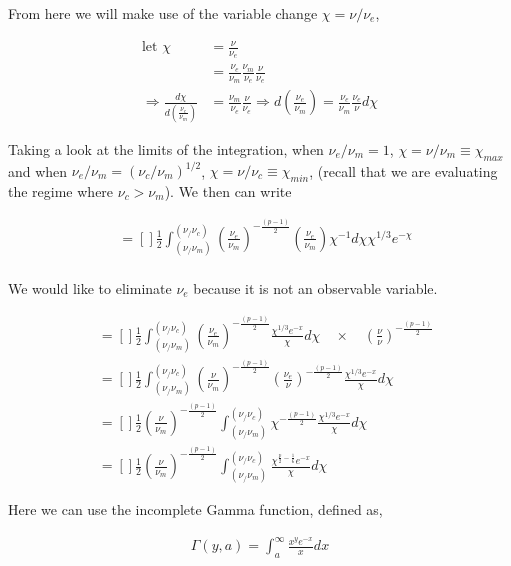 \documentclass[linenumbers,twocolumn]{aastex631}
\begin{document}
\begin{appendix}
From here we will make use of the variable change $\chi = \nu/\nu_e$,

\begin{align}
	\text{let } \chi &= \frac{\nu}{\nu_e}\\
	&= \frac{\nu_e}{\nu_m}\frac{\nu_m}{\nu_e}\frac{\nu}{\nu_e}\\
	\Rightarrow \frac{d\chi}{d\left(\frac{\nu_e}{\nu_m}\right)} &= \frac{\nu_m}{\nu_e} \frac{\nu}{\nu_e} \Rightarrow  d\left(\frac{\nu_e}{\nu_m}\right) = \frac{\nu_e}{\nu_m} \frac{\nu_e}{\nu} d\chi
\end{align}

Taking a look at the limits of the integration, when $\nu_e/\nu_m = 1$, $\chi = \nu/\nu_m \equiv \chi_{max}$ and when $\nu_e/\nu_m = (\nu_c/\nu_m)^{1/2}$, $\chi = \nu/\nu_c \equiv \chi_{min}$, (recall that we are evaluating the regime where $\nu_c > \nu_m$). We then can write

\begin{align}
	&= \left[\right]\frac{1}{2} \int_{(\nu_/\nu_m)}^{(\nu_/\nu_c)} \left(\frac{\nu_e}{\nu_m}\right)^{-\frac{(p-1)}{2}} \left(\frac{\nu_e}{\nu_m}\right) \chi^{-1} d\chi \chi^{1/3} e^{-\chi} \\
\end{align}

We would like to eliminate $\nu_e$ because it is not an observable variable. 

\begin{align}
	&= [ ]\frac{1}{2} \int_{(\nu_/\nu_m)}^{(\nu_/\nu_c)} \left(\frac{\nu_e}{\nu_m}\right)^{-\frac{(p-1)}{2}} \frac{\chi^{1/3}e^{-x}}{\chi} d\chi \quad \times \quad \left(\frac{\nu}{\nu}\right)^{-\frac{(p-1)}{2}} \\
	&= [ ]\frac{1}{2} \int_{(\nu_/\nu_m)}^{(\nu_/\nu_c)} \left(\frac{\nu}{\nu_m}\right)^{-\frac{(p-1)}{2}} \left(\frac{\nu_e}{\nu}\right)^{-\frac{(p-1)}{2}} \frac{\chi^{1/3}e^{-x}}{\chi} d\chi\\
	&= [ ]\frac{1}{2} \left(\frac{\nu}{\nu_m}\right)^{-\frac{(p-1)}{2}} \int_{(\nu_/\nu_m)}^{(\nu_/\nu_c)} \chi^{-\frac{(p-1)}{2}} \frac{\chi^{1/3}e^{-x}}{\chi} d\chi \\
	&= [ ]\frac{1}{2} \left(\frac{\nu}{\nu_m}\right)^{-\frac{(p-1)}{2}} \int_{(\nu_/\nu_m)}^{(\nu_/\nu_c)} \frac{ \chi^{ \frac{p}{2} - \frac{1}{6} } e^{-x} }{\chi} d\chi
\end{align}

Here we can use the incomplete Gamma function, defined as,

\begin{align}
	\Gamma(y,a) = \int_a^\infty \frac{x^y e^{-x}}{x} dx
\end{align}


\end{appendix}
\end{document}
